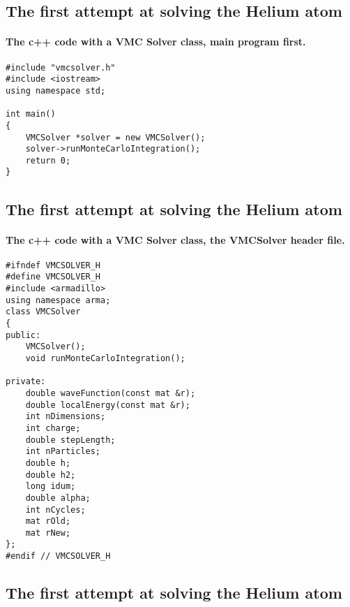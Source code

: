 \documentclass[%
twoside,                 %
final,                   %
10pt]{article}
\begin{document}
\subsection*{The first attempt at solving the Helium atom}

\paragraph{The c++ code with a VMC Solver class, main program first.}

\begin{verbatim}
#include "vmcsolver.h"
#include <iostream>
using namespace std;

int main()
{
    VMCSolver *solver = new VMCSolver();
    solver->runMonteCarloIntegration();
    return 0;
}
\end{verbatim}



\subsection*{The first attempt at solving the Helium atom}

\paragraph{The c++ code with a VMC Solver class, the VMCSolver header file.}

\begin{verbatim}
#ifndef VMCSOLVER_H
#define VMCSOLVER_H
#include <armadillo>
using namespace arma;
class VMCSolver
{
public:
    VMCSolver();
    void runMonteCarloIntegration();

private:
    double waveFunction(const mat &r);
    double localEnergy(const mat &r);
    int nDimensions;
    int charge;
    double stepLength;
    int nParticles;
    double h;
    double h2;
    long idum;
    double alpha;
    int nCycles;
    mat rOld;
    mat rNew;
};
#endif // VMCSOLVER_H
\end{verbatim}



\subsection*{The first attempt at solving the Helium atom}
\end{document}
